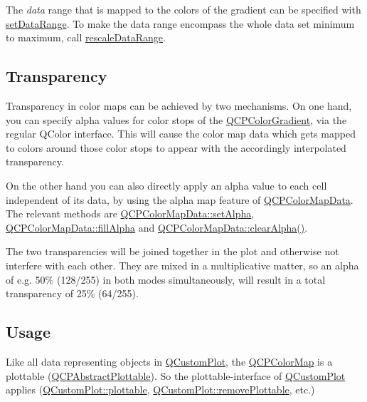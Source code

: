 The {\itshape data} range that is mapped to the colors of the gradient can be specified with \mbox{\hyperlink{class_q_c_p_color_map_a980b42837821159786a85b4b7dcb8774}{set\+Data\+Range}}. To make the data range encompass the whole data set minimum to maximum, call \mbox{\hyperlink{class_q_c_p_color_map_a856608fa3dd1cc290bcd5f29a5575774}{rescale\+Data\+Range}}.\hypertarget{class_q_c_p_color_map_qcpcolormap-transparency}{}\subsection{Transparency}\label{class_q_c_p_color_map_qcpcolormap-transparency}
Transparency in color maps can be achieved by two mechanisms. On one hand, you can specify alpha values for color stops of the \mbox{\hyperlink{class_q_c_p_color_gradient}{Q\+C\+P\+Color\+Gradient}}, via the regular Q\+Color interface. This will cause the color map data which gets mapped to colors around those color stops to appear with the accordingly interpolated transparency.

On the other hand you can also directly apply an alpha value to each cell independent of its data, by using the alpha map feature of \mbox{\hyperlink{class_q_c_p_color_map_data}{Q\+C\+P\+Color\+Map\+Data}}. The relevant methods are \mbox{\hyperlink{class_q_c_p_color_map_data_aaf7de5b34c58f38d8f4c1ceb064a876c}{Q\+C\+P\+Color\+Map\+Data\+::set\+Alpha}}, \mbox{\hyperlink{class_q_c_p_color_map_data_a93e2a549d7702bc849cd48a585294657}{Q\+C\+P\+Color\+Map\+Data\+::fill\+Alpha}} and \mbox{\hyperlink{class_q_c_p_color_map_data_a14d08b9c3720cd719400079b86d3906b}{Q\+C\+P\+Color\+Map\+Data\+::clear\+Alpha()}}.

The two transparencies will be joined together in the plot and otherwise not interfere with each other. They are mixed in a multiplicative matter, so an alpha of e.\+g. 50\% (128/255) in both modes simultaneously, will result in a total transparency of 25\% (64/255).\hypertarget{class_q_c_p_color_map_qcpcolormap-usage}{}\subsection{Usage}\label{class_q_c_p_color_map_qcpcolormap-usage}
Like all data representing objects in \mbox{\hyperlink{class_q_custom_plot}{Q\+Custom\+Plot}}, the \mbox{\hyperlink{class_q_c_p_color_map}{Q\+C\+P\+Color\+Map}} is a plottable (\mbox{\hyperlink{class_q_c_p_abstract_plottable}{Q\+C\+P\+Abstract\+Plottable}}). So the plottable-\/interface of \mbox{\hyperlink{class_q_custom_plot}{Q\+Custom\+Plot}} applies (\mbox{\hyperlink{class_q_custom_plot_a32de81ff53e263e785b83b52ecd99d6f}{Q\+Custom\+Plot\+::plottable}}, \mbox{\hyperlink{class_q_custom_plot_af3dafd56884208474f311d6226513ab2}{Q\+Custom\+Plot\+::remove\+Plottable}}, etc.)

